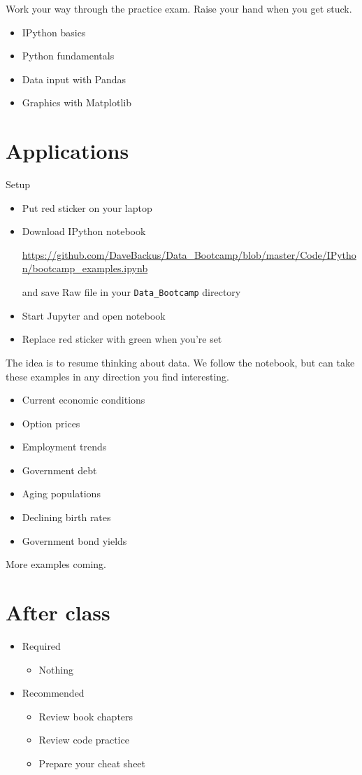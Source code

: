 \documentclass[11pt]{article}
\begin{document}
Work your way through the practice exam.  Raise your hand when you get stuck.
\begin{itemize}
\item IPython basics
\item Python fundamentals
\item Data input with Pandas
\item Graphics with Matplotlib
\end{itemize}


\section*{Applications}

{Setup}
\begin{itemize}
\item Put red sticker on your laptop

\item Download IPython notebook

\url{https://github.com/DaveBackus/Data_Bootcamp/blob/master/Code/IPython/bootcamp_examples.ipynb} %

and save Raw file in your \verb|Data_Bootcamp| directory
\item Start Jupyter and open notebook
\item Replace red sticker with green when you're set
\end{itemize}

The idea is to resume thinking about data.
We follow the notebook, but can take these examples in any direction you find interesting.
\begin{itemize}
\item Current economic conditions
\item Option prices
\item Employment trends
\item Government debt
\item Aging populations
\item Declining birth rates
\item Government bond yields
\end{itemize}
More examples coming.

\section*{After class}

\begin{itemize}
\item Required
\begin{itemize}
\item Nothing
\end{itemize}
\item Recommended
\begin{itemize}
\item Review book chapters
\item Review code practice
\item Prepare your cheat sheet
\end{itemize}
\end{itemize}


\end{document}

